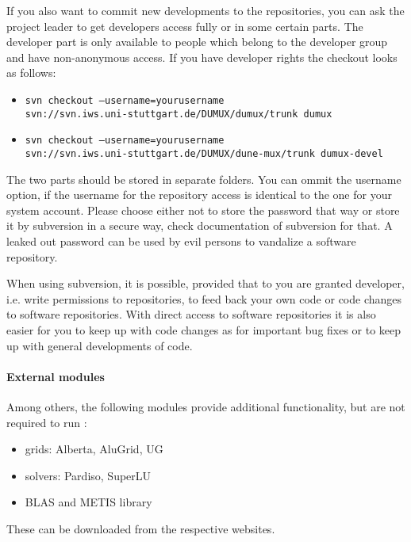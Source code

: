 If you also want to commit new developments to the repositories, you can ask the \Dumux project leader to get developers access fully or in some certain parts. The developer part is only available to people which belong to the \Dumux developer group and have non-anonymous access. If you have developer rights the checkout looks as follows: 
\begin{itemize}
 \item \texttt{svn checkout --username=yourusername \\ 
      \hspace{4cm} svn://svn.iws.uni-stuttgart.de/DUMUX/dumux/trunk dumux}
 \item \texttt{svn checkout --username=yourusername \\
      \hspace{4cm} svn://svn.iws.uni-stuttgart.de/DUMUX/dune-mux/trunk dumux-devel}
\end{itemize} 
The two parts should be stored in separate folders. You can ommit the username option, if the username for the repository access is identical to the one for your system account. Please choose either not to store the password that way or store it by subversion in a secure way, check documentation of subversion for that. A leaked out password can be used by evil persons to vandalize a software repository.

When using subversion, it is possible, provided that to you are granted developer, i.e. write permissions to repositories, to feed back
your own code or code changes to software repositories. With direct access to software repositories it is also easier for you to keep up with code changes as for important bug fixes or to keep up with general developments of code.


\paragraph{External modules}
Among others, the following modules provide additional functionality, but are not required to run \Dumux:
\begin{itemize}
 \item grids: Alberta, AluGrid, UG
 \item solvers: Pardiso, SuperLU
 \item BLAS and METIS library 
\end{itemize}
These can be downloaded from the respective websites.

